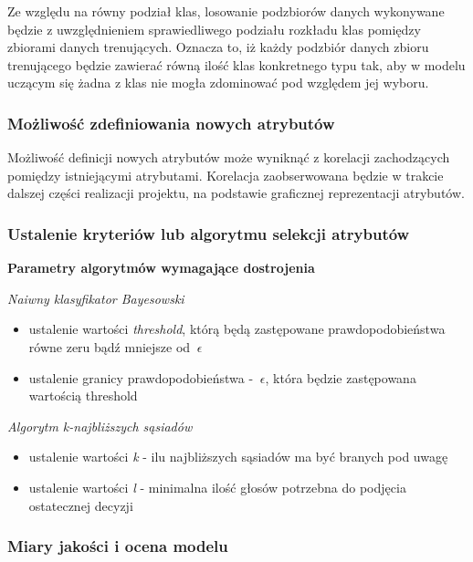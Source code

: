 \documentclass[11pt]{article} %
\begin{document}
Ze względu na równy podział klas, losowanie podzbiorów danych wykonywane będzie z uwzględnieniem sprawiedliwego podziału rozkładu klas pomiędzy zbiorami danych trenujących. Oznacza to, iż każdy podzbiór danych zbioru trenującego będzie zawierać równą ilość klas konkretnego typu tak, aby w modelu uczącym się żadna z klas nie mogła zdominować pod względem jej wyboru.

\subsubsection{Możliwość zdefiniowania nowych atrybutów}

Możliwość definicji nowych atrybutów może wyniknąć z korelacji zachodzących pomiędzy istniejącymi atrybutami. Korelacja zaobserwowana będzie w trakcie dalszej części realizacji projektu, na podstawie graficznej reprezentacji atrybutów.

\subsubsection{Ustalenie kryteriów lub algorytmu selekcji atrybutów}

\textbf{Parametry algorytmów wymagające dostrojenia}

\emph{Naiwny klasyfikator Bayesowski}
\begin{itemize}
\item ustalenie wartości \emph{threshold}, którą będą zastępowane prawdopodobieństwa równe zeru bądź mniejsze od $\ \epsilon $
\item ustalenie granicy prawdopodobieństwa - $\ \epsilon $, która będzie zastępowana wartością threshold
\end{itemize}

\emph{Algorytm k-najbliższych sąsiadów}
\begin{itemize}
\item ustalenie wartości \emph{k} - ilu najbliższych sąsiadów ma być branych pod uwagę
\item ustalenie wartości \emph{l} - minimalna ilość głosów potrzebna do podjęcia ostatecznej decyzji
\end{itemize}

\subsubsection{Miary jakości i ocena modelu}
\end{document}
